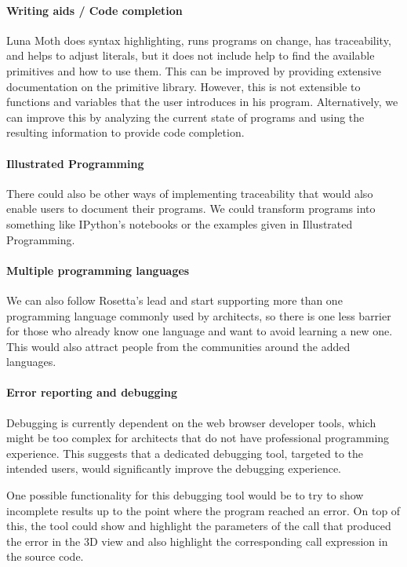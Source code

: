 \paragraph{Writing aids / Code completion}
Luna Moth does syntax highlighting, runs programs on change, has traceability, and helps to adjust literals, but it does not include help to find the available primitives and how to use them.
This can be improved by providing extensive documentation on the primitive library.
However, this is not extensible to functions and variables that the user introduces in his program.
Alternatively, we can improve this by analyzing the current state of programs and using the resulting information to provide code completion.

\paragraph{Illustrated Programming}
There could also be other ways of implementing traceability that would also enable users to document their programs.
We could transform programs into something like IPython's notebooks or the examples given in Illustrated Programming\cite{Leitao2014illustrated}.

\paragraph{Multiple programming languages}
We can also follow Rosetta's lead and start supporting more than one programming language commonly used by architects, so there is one less barrier for those who already know one language and want to avoid learning a new one.
This would also attract people from the communities around the added languages.

\paragraph{Error reporting and debugging}
Debugging is currently dependent on the web browser developer tools, which might be too complex for architects that do not have professional programming experience.
This suggests that a dedicated debugging tool, targeted to the intended users, would significantly improve the debugging experience.

One possible functionality for this debugging tool would be to try to show incomplete results up to the point where the program reached an error.
On top of this, the tool could show and highlight the parameters of the call that produced the error in the 3D view and also highlight the corresponding call expression in the source code.

